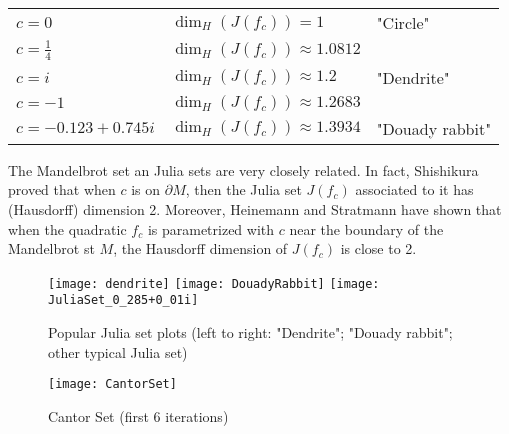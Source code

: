 \vspace{0.2cm}
\begin{tabular}{l l l}\label{table:JuliaSetDimensions}
	$c = 0$             & $\dim_H(J(f_c)) = 1$            & "Circle"\\
	$c = \frac{1}{4}$   & $\dim_H(J(f_c)) \approx 1.0812$ & \\
	$c = i$             & $\dim_H(J(f_c)) \approx 1.2$    & "Dendrite" \\
	$c = -1$            & $\dim_H(J(f_c)) \approx 1.2683$ & \\
	$c = -0.123+0.745i$ & $\dim_H(J(f_c)) \approx 1.3934$ & "Douady rabbit" \\
\end{tabular}
\vspace{0.3cm}

The Mandelbrot set an Julia sets are very closely related.
In fact, Shishikura proved \cite{Shishikura_1992} that when $c$ is on $\partial M$, then the Julia set $J(f_c)$ associated to it has (Hausdorff) dimension 2.
Moreover, Heinemann and Stratmann have shown \cite{Heinemann_Stratmann_1998} that when the quadratic $f_c$ is parametrized with $c$ near the boundary of the Mandelbrot st $M$, the Hausdorff dimension of $J(f_c)$ is close to 2.

\begin{figure}[h]
	\texttt{[image: dendrite]}
	\texttt{[image: DouadyRabbit]}
	\texttt{[image: JuliaSet\_0\_285+0\_01i]}
	\centering
	\captionsetup{justification=centering}
	\caption[Julia sets examples]{Popular Julia set plots \newline (left to right: "Dendrite"\footnotemark; "Douady rabbit"\footnotemark; other typical Julia set\footnotemark)}
	\label{fig:JuliaSet}
\end{figure}
\addtocounter{footnote}{-3}



\vspace{-0.5cm}
\begin{wrapfigure}{r}{5cm}
	\texttt{[image: CantorSet]}
	\centering
	\captionsetup{justification=centering}
	\caption{Cantor Set (first 6 iterations)}
	\label{fig:CantorSet}
	\vspace{-1.5cm}
\end{wrapfigure}
